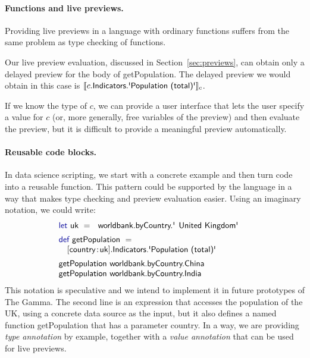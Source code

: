 \documentclass[sigplan,10pt,review,anonymous]{acmart}\settopmatter{printfolios=true,printccs=false,printacmref=false}
\theoremstyle{plain}
\theoremstyle{definition}
\newcommand{\ident}[1]{\textnormal{\sffamily #1}}
\newcommand{\kvd}[1]{\textnormal{\textcolor{kvdclr}{\sffamily #1}}}
\begin{document}
\paragraph{Functions and live previews.} 
Providing live previews in a language with ordinary functions suffers from the same problem as 
type checking of functions.

Our live preview evaluation, discussed in Section~\ref{sec:previews}, can obtain only a delayed 
preview for the body of \ident{getPopulation}. The delayed preview we would obtain in this case
is $\llbracket c.\ident{Indicators}.\ident{\textquotesingle Population (total)\textquotesingle} \rrbracket_{c}$.

If we know the type of $c$, we can provide a user interface that lets the user specify a value 
for $c$ (or, more generally, free variables of the preview) and then evaluate the preview, but 
it is difficult to provide a meaningful preview automatically.

\paragraph{Reusable code blocks.}
In data science scripting, we start with a concrete example and then turn code into a reusable
function. This pattern could be supported by the language in a way that makes type checking
and preview evaluation easier. Using an imaginary notation, we could write:
%
\begin{equation*}
\begin{array}{l}
\kvd{let}~\ident{uk}~=~\ident{worldbank.byCountry.\textquotesingle United Kingdom\textquotesingle}\hspace{1.5em}\\[0.5em]
\kvd{def}~\ident{getPopulation}~=\\
\quad\lbrack\ident{country}\!:\!\ident{uk}\rbrack.\ident{Indicators.\textquotesingle Population (total)\textquotesingle}\\[0.5em]
\ident{getPopulation}~\ident{worldbank.byCountry.China}\\
\ident{getPopulation}~\ident{worldbank.byCountry.India}
\end{array}
\end{equation*}
%
This notation is speculative and we intend to implement it in future prototypes of The Gamma.
The second line is an expression that accesses the population of the UK, using a concrete
data source as the input, but it also defines a named function \ident{getPopulation} that has a
parameter \ident{country}. In a way, we are providing \emph{type annotation} by example, together
with a \emph{value annotation} that can be used for live previews.
\end{document}
